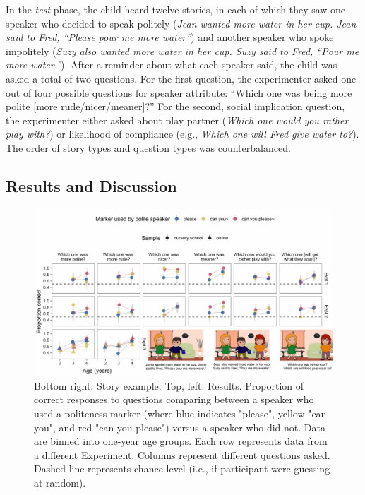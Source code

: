 \documentclass[oneside]{report}
\newcommand{\blandscape}{\begin{landscape}}
\newcommand{\elandscape}{\end{landscape}}
\begin{document}
In the \emph{test} phase, the child heard twelve stories, in each of
which they saw one speaker who decided to speak politely (\emph{Jean
wanted more water in her cup. Jean said to Fred, ``Please pour me more
water''}) and another speaker who spoke impolitely (\emph{Suzy also
wanted more water in her cup. Suzy said to Fred, ``Pour me more
water.''}). After a reminder about what each speaker said, the child was
asked a total of two questions. For the first question, the experimenter
asked one out of four possible questions for speaker attribute: ``Which
one was being more polite {[}more rude/nicer/meaner{]}?'' For the
second, social implication question, the experimenter either asked about
play partner (\emph{Which one would you rather play with?}) or
likelihood of compliance (e.g., \emph{Which one will Fred give water
to?}). The order of story types and question types was counterbalanced.

\subsection{Results and Discussion}\label{results-and-discussion}

\newpage

\blandscape
\begin{figure}[p]

{\centering \includegraphics[width=0.9\linewidth]{erica_yoon_dissertation_files/figure-latex/figResultsPlacement-1} 

}

\caption[Speaker ratings in Experiments 2.1-2.3]{Bottom right: Story example. Top, left: Results. Proportion of correct responses to questions comparing between a speaker who used a politeness marker (where blue indicates "please", yellow "can you", and red "can you please") versus a speaker who did not. Data are binned into one-year age groups. Each row represents data from a different Experiment. Columns represent different questions asked. Dashed line represents chance level (i.e., if participant were guessing at random).}\label{fig:figResultsPlacement}
\end{figure}
\elandscape
\end{document}
